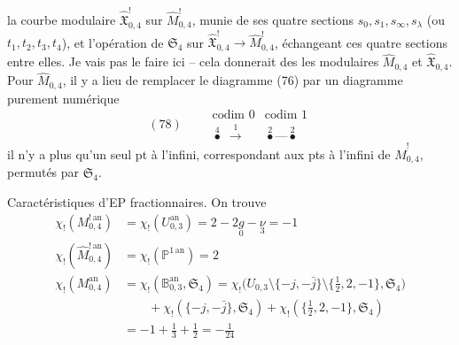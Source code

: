 \documentclass[11pt,a4paper]{article}
\begin{document}
la courbe modulaire $\widehat{\mathfrak{X}}^{!}_{0,4}$ sur $\widehat{M}^{!}_{0,4}$, munie de ses quatre sections $s_0, s_1, s_\infty, s_\lambda$ (ou $t_1, t_2, t_3, t_4$), et \ill{} l'opération de $\mathfrak{S}_4$  sur $\widehat{\mathfrak{X}}^{!}_{0,4} \to \widehat{M}^{!}_{0,4}$, échangeant ces quatre sections entre elles. Je vais pas le faire ici -- cela donnerait des  les   modulaires $\widehat{M}_{0,4}$ et $\widehat{\mathfrak{X}}_{0,4}$. Pour $\widehat{M}_{0,4}$, il y a lieu de remplacer le diagramme (76) par un diagramme purement numérique
\[
(78)\qquad
\begin{array}{c|c}
\text{codim } 0 & \text{codim } 1 \\ \hline
\overset{4}{\bullet} \;\xrightarrow{\;1\;} & \overset{2}{\bullet}\!\text{---}\!\overset{2}{\bullet}
\end{array}
\]
il n'y a plus qu'un seul pt à l'infini, correspondant aux  pts à l'infini de $\widehat{M}^{!}_{0,4}$, permutés  par $\mathfrak{S}_4$.

Caractéristiques d'EP fractionnaires. On trouve
\begin{align*}
\chi_!(M^{!\,\mathrm{an}}_{0,4}) &= \chi_!(U^{\mathrm{an}}_{0,3}) = 2 - 2\underset{0}{g} - \underset{3}{\nu} = -1 \\
\chi_!(\widehat{M}^{!\,\mathrm{an}}_{0,4}) &= \chi_!(\mathbb{P}^{1\,\mathrm{an}}) = 2 \\
\chi_!(M^{\mathrm{an}}_{0,4}) &= \chi_!(\mathbb{B}^{\mathrm{an}}_{0,3}, \mathfrak{S}_4)
= \chi_!\bigl(U_{0,3} \setminus \{-j, -\bar{j}\} \setminus \{\tfrac12, 2, -1\}, \mathfrak{S}_4\bigr) \\
&\qquad + \chi_!(\{-j, -\bar{j}\}, \mathfrak{S}_4) + \chi_!(\{\tfrac12, 2, -1\}, \mathfrak{S}_4) \\
&= -1 + \tfrac13 + \tfrac12 = -\tfrac{1}{24}
\end{align*}
\end{document}
